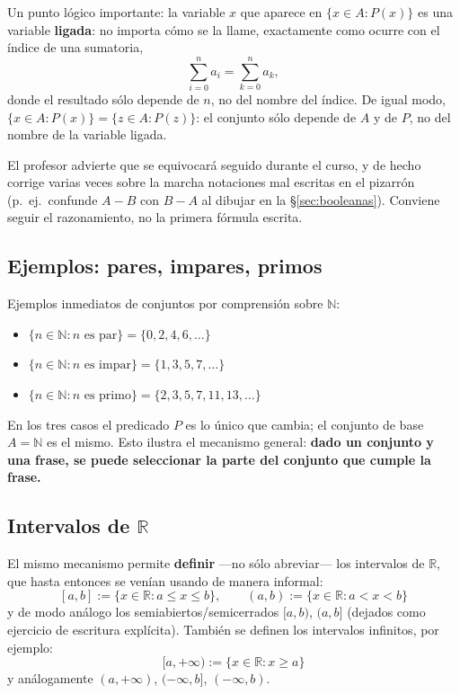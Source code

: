 \documentclass[12pt,a4paper]{article}
\begin{document}
Un punto lógico importante: la variable $x$ que aparece en $\{x \in A : P(x)\}$ es una variable \textbf{ligada}: no importa cómo se la llame, exactamente como ocurre con el índice de una sumatoria,
$$\sum_{i=0}^n a_i = \sum_{k=0}^n a_k,$$
donde el resultado sólo depende de $n$, no del nombre del índice. De igual modo, $\{x \in A : P(x)\} = \{z \in A : P(z)\}$: el conjunto sólo depende de $A$ y de $P$, no del nombre de la variable ligada.

\begin{notebox}
El profesor advierte que se equivocará seguido durante el curso, y de hecho corrige varias veces sobre la marcha notaciones mal escritas en el pizarrón (p.\ ej.\ confunde $A-B$ con $B-A$ al dibujar en la §\ref{sec:booleanas}). Conviene seguir el razonamiento, no la primera fórmula escrita.
\end{notebox}

\subsection{Ejemplos: pares, impares, primos}

Ejemplos inmediatos de conjuntos por comprensión sobre $\mathbb N$:
\begin{itemize}
  \item $\{n \in \mathbb N : n \text{ es par}\} = \{0, 2, 4, 6, \dots\}$
  \item $\{n \in \mathbb N : n \text{ es impar}\} = \{1, 3, 5, 7, \dots\}$
  \item $\{n \in \mathbb N : n \text{ es primo}\} = \{2, 3, 5, 7, 11, 13, \dots\}$
\end{itemize}

En los tres casos el predicado $P$ es lo único que cambia; el conjunto de base $A=\mathbb N$ es el mismo. Esto ilustra el mecanismo general: \textbf{dado un conjunto y una frase, se puede seleccionar la parte del conjunto que cumple la frase.}

\subsection{Intervalos de \texorpdfstring{$\mathbb{R}$}{R}}

El mismo mecanismo permite \textbf{definir} —no sólo abreviar— los intervalos de $\mathbb R$, que hasta entonces se venían usando de manera informal:
$$[a,b] := \{x \in \mathbb{R} : a \le x \le b\}, \qquad (a,b) := \{x \in \mathbb{R} : a < x < b\}$$
y de modo análogo los semiabiertos/semicerrados $[a,b)$, $(a,b]$ (dejados como ejercicio de escritura explícita). También se definen los intervalos infinitos, por ejemplo:
$$[a,+\infty) := \{x \in \mathbb R : x \ge a\}$$
y análogamente $(a,+\infty)$, $(-\infty,b]$, $(-\infty,b)$.
\end{document}
